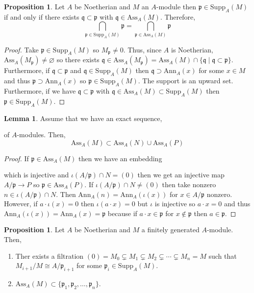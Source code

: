 \documentclass[12pt]{article}
\newcommand{\Ann}[2]{\mathrm{Ann}_{#1}\left(#2\right)}
\newcommand{\Ass}[2]{\mathrm{Ass}_{#1}\left( #2 \right)}
\newcommand{\supp}[2]{\mathrm{Supp}_{#1} \left( #2 \right) }
\newcommand{\Supp}[2]{\mathrm{Supp}_{#1}\left(#2 \right)}
\newcommand{\p}{\mathfrak{p}}
\newcommand{\q}{\mathfrak{q}}
\theoremstyle{remark}
\theoremstyle{definition}
\newtheorem{lemma}[theorem]{Lemma}
\newtheorem{proposition}[theorem]{Proposition}
\begin{document}
\begin{proposition}
Let $A$ be Noetherian and $M$ an $A$-module then $\p \in \Supp{A}{M}$ if and only if there exists $\q \subset \p$ with $\q \in \Ass{A}{M}$. Therefore, \[ \bigcap_{\p \in \Supp{A}{M}} \p = \bigcap_{\p \in \Ass{A}{M}} \p \]
\end{proposition}

\begin{proof}
Take $\p \in \Supp{A}{M}$ so $M_\p \neq 0$. Thus, since $A$ is Noetherian, $\Ass{A}{M_\p} \neq \varnothing$ so there exists $\q \in \Ass{A}{M_\p} = \Ass{A}{M} \cap \{ \q \mid \q \subset \p \}$. Furthermore, if $\q \subset \p$ and $\q \in \Supp{A}{M}$ then $\q \supset \Ann{A}{x}$ for some $x \in M$ and thus $\p \supset \Ann{A}{x}$ so $\p \in \Supp{A}{M}$. The support is an upward set. Furthermore, if we have $\q \subset \p$ with $\q \in \Ass{A}{M} \subset \Supp{A}{M}$ then $\p \in \Supp{A}{M}$.  
\end{proof}

\begin{lemma}
Assume that we have an exact sequence,
\begin{center}
\end{center} 
of $A$-modules. Then,
\[ \Ass{A}{M} \subset \Ass{A}{N} \cup \Ass{A}{P} \]
\end{lemma}

\begin{proof}
If $\p \in \Ass{A}{M}$ then we have an embedding
\begin{center}
\end{center}
which is injective and $\iota(A / \p) \cap N = (0)$
then we get an injective map $A / \p \to P$ so $\p \in \Ass{A}{P}$. If $\iota(A / \p) \cap N \neq (0)$ then take nonzero $n \in \iota(A / \p) \cap N$. Then $\Ann{A}{n} = \Ann{A}{\iota(x)}$ for $x \in A / \p$ nonzero. However, if $a \cdot \iota(x) = 0$ then $\iota(a \cdot x) = 0$ but $\iota$ is injective so $a \cdot x = 0$ and thus $\Ann{A}{\iota(x)} = \Ann{A}{x} = \p$ because if $a \cdot x \in \p$ for $x \notin \p$ then $a \in \p$. 
\end{proof}

\begin{proposition}
Let $A$ be Noetherian and $M$ a finitely generated $A$-module. Then,
\begin{enumerate}
\item Ther exists a filtration $(0) = M_0 \subsetneq M_1 \subsetneq M_2 \subsetneq \cdots \subsetneq M_n = M$ such that $M_{i + 1} / M \cong A / \p_{i+1}$ for some $\p_i \in \supp{A}{M}$.
\item $\Ass{A}{M} \subset \{ \p_1, \p_2, \dots, \p_n\}$.
\end{enumerate}
\end{proposition}
\end{document}
